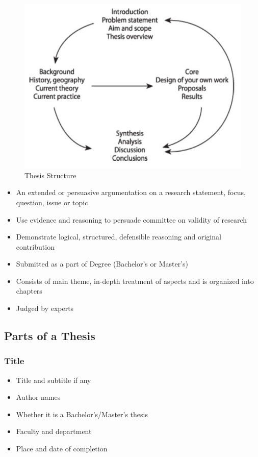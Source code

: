 \documentclass{article}
\begin{document}
\begin{figure}[htp]
    \centering
    \includegraphics[width=0.7 \linewidth]{img/thesis-structure.png}
    \caption{Thesis Structure}
    \label{fig:report-process}
\end{figure}

\begin{itemize}
    \item An extended or persuasive argumentation on a research statement, focus, question, issue or topic
    \item Use evidence and reasoning to persuade committee on validity of research
    \item Demonstrate logical, structured, defensible reasoning and original contribution
    \item Submitted as a part of Degree (Bachelor's or Master's)
    \item Consists of main theme, in-depth treatment of aspects and is organized into chapters
    \item Judged by experts
\end{itemize}

\subsection{Parts of a Thesis}

\subsubsection{Title}

\begin{itemize}
    \item Title and subtitle if any
    \item Author names
    \item Whether it is a Bachelor's/Master's thesis
    \item Faculty and department
    \item Place and date of completion
\end{itemize}
\end{document}
